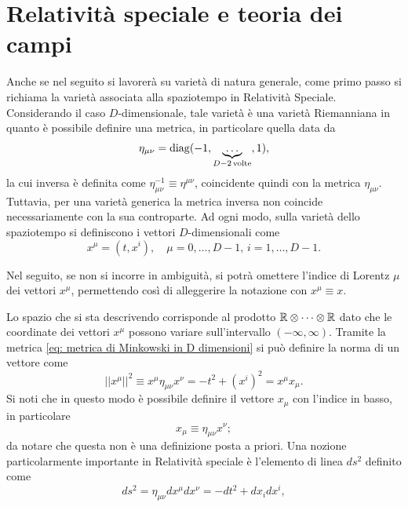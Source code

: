 \section{Relatività speciale e teoria dei campi}
Anche se nel seguito si lavorerà su varietà di natura generale, come primo passo si richiama la varietà associata alla spaziotempo in Relatività Speciale. Considerando il caso $D$-dimensionale, tale varietà è una varietà Riemanniana in quanto è possibile definire una metrica, in particolare quella data da
\begin{equation}
\label{eq: metrica di Minkowski in D dimensioni}
    \eta_{\mu\nu} = \mathrm{diag}{(-1,\underbrace{\dots}_{D - 2\,\mathrm{volte}},1)},
\end{equation}
la cui inversa è definita come $\eta_{\mu\nu}^{-1} \equiv \eta^{\mu\nu}$, coincidente quindi con la metrica $\eta_{\mu\nu}$. Tuttavia, per una varietà generica la metrica inversa non coincide necessariamente con la sua controparte. Ad ogni modo, sulla varietà dello spaziotempo si definiscono i vettori $D$-dimensionali come
\begin{equation}
    x^\mu = (t,x^i),\quad \mu = 0, \dots, D - 1,\,i = 1, \dots, D - 1.
\end{equation}
\begin{notz}
    Nel seguito, se non si incorre in ambiguità, si potrà omettere l'indice di Lorentz $\mu$ dei vettori $x^\mu$, permettendo così di alleggerire la notazione con $x^\mu \equiv x$.
\end{notz}
Lo spazio che si sta descrivendo corrisponde al prodotto $\mathbb{R} \otimes \cdots \otimes \mathbb{R}$ dato che le coordinate dei vettori $x^\mu$ possono variare sull'intervallo $(-\infty,\infty)$. Tramite la metrica \eqref{eq: metrica di Minkowski in D dimensioni} si può definire la norma di un vettore come
\begin{equation}
\label{eq: norma su spazio di Minkowski in D dimensioni}
    ||x^\mu||^2 \equiv x^\mu\eta_{\mu\nu}x^\nu = -t^2 + (x^i)^2 = x^\mu x_\mu.
\end{equation}
Si noti che in questo modo è possibile definire il vettore $x_\mu$ con l'indice in basso, in particolare
\begin{equation}
    x_\mu \equiv \eta_{\mu\nu}x^\nu;
\end{equation}
da notare che questa non è una definizione posta a priori. Una nozione particolarmente importante in Relatività speciale è l'elemento di linea $ds^2$ definito come
\begin{equation}
    ds^2 = \eta_{\mu\nu}dx^\mu dx^\nu = -dt^2 + dx_idx^i,
\end{equation}
